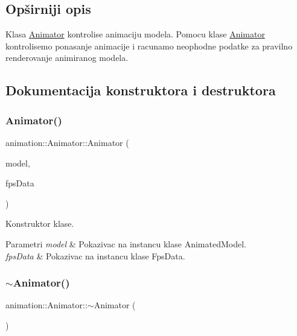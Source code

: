 \subsection{Opširniji opis}
Klasa \hyperlink{classanimation_1_1Animator}{Animator} kontrolise animaciju modela. Pomocu klase \hyperlink{classanimation_1_1Animator}{Animator} kontrolisemo ponasanje animacije i racunamo neophodne podatke za pravilno renderovanje animiranog modela. 

\subsection{Dokumentacija konstruktora i destruktora}
\mbox{\label{classanimation_1_1Animator_ab8f3fac8a3500bf117e3a68c6cf58b62}} 
\subsubsection{\texorpdfstring{Animator()}{Animator()}}
{\footnotesize\ttfamily animation\+::\+Animator\+::\+Animator (\begin{DoxyParamCaption}\item[{\hyperlink{classmodel_1_1AnimatedModel}{Animated\+Model} $\ast$}]{model,  }\item[{\hyperlink{classutility_1_1FpsData}{Fps\+Data} $\ast$}]{fps\+Data }\end{DoxyParamCaption})}



Konstruktor klase. 


\begin{DoxyParams}{Parametri}
{\em model} & Pokazivac na instancu klase Animated\+Model. \\
\hline
{\em fps\+Data} & Pokazivac na instancu klase Fps\+Data. \\
\hline
\end{DoxyParams}
\mbox{\label{classanimation_1_1Animator_aa41360723d4542becc20a238f25bed4a}} 
\subsubsection{\texorpdfstring{$\sim$\+Animator()}{~Animator()}}
{\footnotesize\ttfamily animation\+::\+Animator\+::$\sim$\+Animator (\begin{DoxyParamCaption}{ }\end{DoxyParamCaption})}



